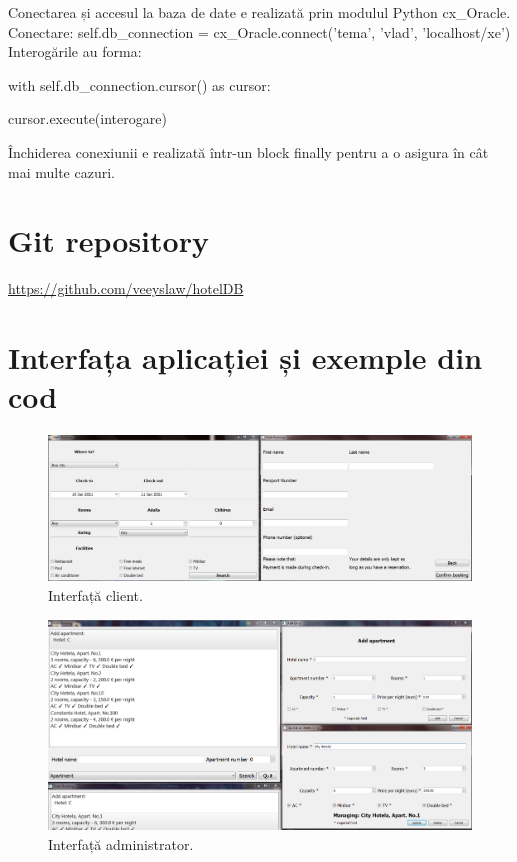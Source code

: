 \documentclass[12pt]{article}
\begin{document}
Conectarea și accesul la baza de date e realizată prin modulul Python cx\_Oracle.
\smallskip
Conectare: self.db\_connection = cx\_Oracle.connect('tema', 'vlad', 'localhost/xe')
\smallskip
Interogările au forma:

with self.db\_connection.cursor() as cursor:

\hspace{1cm} cursor.execute(interogare)

Închiderea conexiunii e realizată într-un block finally pentru a o asigura în cât mai multe cazuri.

\section{Git repository}

\url{https://github.com/veeyslaw/hotelDB}

\newpage

\section{Interfața aplicației și exemple din cod}

\begin{figure}[!htb]
	\centering
	\includegraphics[width=\linewidth]{ClientInt.PNG}
	\caption{Interfață client.}\label{fig:fig2}
\end{figure}

\begin{figure}[!htb]
	\centering
	\includegraphics[width=\linewidth]{AdminInt.PNG}
	\caption{Interfață administrator.}\label{fig:fig3}
\end{figure}
\end{document}
